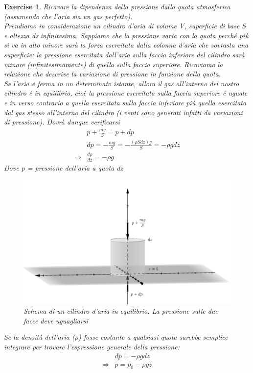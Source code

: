 \documentclass[10pt,a4paper]{article}
\newtheorem{exercise}{Exercise}
\begin{document}
\begin{exercise}\label{ex:pressione_quota}
Ricavare la dipendenza della pressione dalla quota atmosferica (assumendo che l’aria sia un gas perfetto).\\
Prendiamo in considerazione un cilindro d'aria di volume V, superficie di base S e altezza dz infinitesima. Sappiamo che la pressione varia con la quota perché più si va in alto minore sarà la forza esercitata dalla colonna d'aria che sovrasta una superficie: la pressione esercitata dall'aria sulla faccia inferiore del cilindro sarà minore (infinitesimamente) di quella sulla faccia superiore. Ricaviamo la relazione che descrive la variazione di pressione in funzione della quota.\\
Se l'aria è ferma in un determinato istante, allora il gas all'interno del nostro cilindro è in equilibrio, cioè la pressione esercitata sulla faccia superiore è uguale e in verso contrario a quella esercitata sulla faccia inferiore più quella esercitata dal gas stesso all'interno del cilindro (i venti sono generati infatti da variazioni di pressione). Dovrà dunque verificarsi
\begin{align}\label{eq:stevin}
	&p + \frac{m g}{S} = p + dp \nonumber \\
	&dp = -\frac{m g}{S} = -\frac{(\rho S dz) g}{S}= -\rho g dz \nonumber \\
	\Rightarrow & \frac{d\rho}{dz}= - \rho g
\end{align} 
Dove p = pressione dell'aria a quota dz
\begin{figure}[h!]
	\centering
	\includegraphics[width=0.5\linewidth]{../images/cilindro_aria}
	\caption{Schema di un cilindro d'aria in equilibrio. La pressione sulle due facce deve uguagliarsi}
	\label{fig:cilindroaria}
\end{figure}
\FloatBarrier
Se la densità dell'aria ($\rho$) fosse costante a qualsiasi quota sarebbe semplice integrare per trovare l'espressione generale della pressione:
\begin{align*} 
	&dp = -\rho  g dz \\
	\Rightarrow & p = p_0 - \rho g z
\end{align*} 

\end{exercise}
\end{document}
